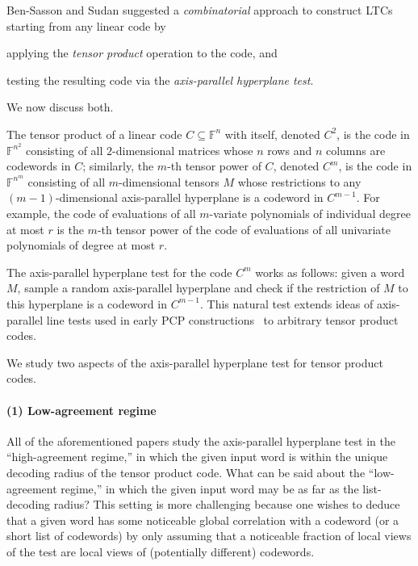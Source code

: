 \documentclass[11pt]{article}
\numberwithin{equation}{section}
\theoremstyle{definition}
\theoremstyle{plain}
\theoremstyle{plain}
\newcommand{\colored}{}
\newcommand{\blocklength}{\colored{n}} %
\newcommand{\testerinput}{\colored{M}} %
\newcommand{\Field}{\colored{\mathbb F}}
\newcommand{\degree}{\colored{r}}
\newcommand{\parhead}{\paragraph}
\begin{document}
Ben-Sasson and Sudan \cite{Ben-SassonS06} suggested a \emph{combinatorial} approach to construct LTCs starting from any linear code by
\begin{inparaenum}[(i)]
 \item applying the \emph{tensor product} operation \cite{Wolf65,WolfE63} to the code, and
 \item testing the resulting code via the \emph{axis-parallel hyperplane test}.
\end{inparaenum}
We now discuss both.

%
%
The tensor product of a linear code $C \subseteq \Field^{\blocklength}$ with itself,    %
denoted $C^{2}$, is the code in $\Field^{\blocklength^{2}}$ consisting of all $2$-dimensional matrices whose $\blocklength$ rows and $\blocklength$ columns are codewords in $C$; similarly,
%
the $m$-th tensor power                                                         %
of $C$, denoted $C^{m}$, is the code in $\Field^{\blocklength^m}$ consisting of all $m$-dimensional
%
tensors     %
$\testerinput$ whose restrictions to any $(m-1)$-dimensional axis-parallel hyperplane is a codeword in $C^{m-1}$. For example, the code of evaluations of all $m$-variate polynomials of individual degree at most $\degree$
%
is the $m$-th tensor power                                                      %
of the code of evaluations of all univariate polynomials of degree at most $\degree$.

The axis-parallel hyperplane test for the code $C^{m}$ works as follows: given a word $\testerinput$, sample a random axis-parallel hyperplane and check if the restriction of $\testerinput$ to this hyperplane is a codeword in $C^{m-1}$. This natural test extends ideas of axis-parallel line tests used in early PCP constructions~\cite{BabaiFL91,BabaiFLS91, AroraS98} to arbitrary tensor product codes.

We study two aspects of the axis-parallel hyperplane test for tensor product codes.

\parhead{(1) Low-agreement regime}
All of the aforementioned
%
papers  %
study the axis-parallel hyperplane test in the ``high-agreement regime,'' in which the given input word is within the unique decoding radius of the tensor product code. What can be said about the ``low-agreement regime,'' in which the given input word may be as far as the list-decoding radius? This setting is more challenging because one wishes to deduce that a given word has some noticeable global correlation with a codeword (or a short list of codewords) by only assuming that a noticeable fraction of local views of the test are local views of (potentially different) codewords.
\end{document}
